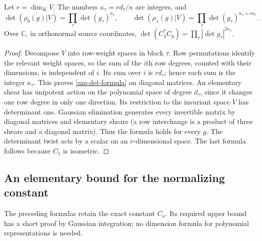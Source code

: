\begin{proposition}\label{am-determinant}
Let $r=\dim_KV$. The numbers $\kappa_\tau=rd_\tau/n$ are integers, and
\[
 \det(\rho_0(g)|V)=\prod_\tau\det(g_\tau)^{\kappa_\tau},\qquad
 \det(\rho_\lambda(g)|V)
                 =\prod_\tau\det(g_\tau)^{\kappa_\tau+ra_\tau}.
 \tag{AM3}\label{am-det-formula}
\]
Over $\mathbb C$, in orthonormal source coordinates,
$\det(C_g^*C_g)=\prod_\tau|\det g_\tau|^{2\kappa_\tau}$.
\end{proposition}
\begin{proof}
Decompose $V$ into row-weight spaces in block $\tau$.
Row permutations identify the relevant weight spaces, so the sum of
the $i$th row degrees, counted with their dimensions, is independent
of $i$. Its sum over $i$ is $rd_\tau$; hence each sum is the integer
$\kappa_\tau$. This proves \eqref{am-det-formula} on diagonal matrices.
An elementary shear has unipotent action on the polynomial space of
degree $d_\tau$, since it changes one row degree in only one direction.
Its restriction to the invariant space $V$ has determinant one.
Gaussian elimination generates every invertible matrix by diagonal
matrices and elementary shears (a row interchange is a product of
three shears and a diagonal matrix). Thus the formula holds for every
$g$. The determinant twist acts by a scalar on an $r$-dimensional
space. The last formula follows because $C_1$ is isometric.
\end{proof}

\subsection{An elementary bound for the normalizing constant}

The preceding formulas retain the exact constant $C_\nu$.
Its required upper bound has a short proof by Gaussian integration;
no dimension formula for polynomial representations is needed.

